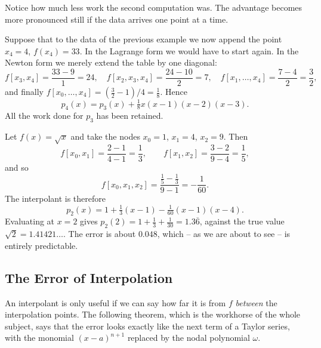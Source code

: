 Notice how much less work the second computation was. The advantage becomes more pronounced still if the data arrives one point at a time.

\begin{example}
  Suppose that to the data of the previous example we now append the point $x_4 = 4$, $f(x_4) = 33$. In the Lagrange form we would have to start again. In the Newton form we merely extend the table by one diagonal:
  $$
  f[x_3, x_4] = \frac{33 - 9}{1} = 24, \quad f[x_2, x_3, x_4] = \frac{24 - 10}{2} = 7, \quad f[x_1, \dots, x_4] = \frac{7 - 4}{2} = \frac{3}{2},
  $$
  and finally $f[x_0, \dots, x_4] = (\tfrac{3}{2} - 1)/4 = \tfrac{1}{8}$. Hence
  $$
  p_4(x) = p_3(x) + \tfrac{1}{8}x(x-1)(x-2)(x-3).
  $$
  All the work done for $p_3$ has been retained.
\end{example}

\begin{example}
  Let $f(x) = \sqrt{x}$ and take the nodes $x_0 = 1$, $x_1 = 4$, $x_2 = 9$. Then
  $$
  f[x_0, x_1] = \frac{2 - 1}{4 - 1} = \frac{1}{3}, \qquad f[x_1, x_2] = \frac{3 - 2}{9 - 4} = \frac{1}{5},
  $$
  and so
  $$
  f[x_0, x_1, x_2] = \frac{\frac{1}{5} - \frac{1}{3}}{9 - 1} = -\frac{1}{60}.
  $$
  The interpolant is therefore
  $$
  p_2(x) = 1 + \tfrac{1}{3}(x-1) - \tfrac{1}{60}(x-1)(x-4).
  $$
  Evaluating at $x = 2$ gives $p_2(2) = 1 + \tfrac{1}{3} + \tfrac{1}{30} = 1.3\overline{6}$, against the true value $\sqrt{2} = 1.41421\ldots$. The error is about $0.048$, which -- as we are about to see -- is entirely predictable.
\end{example}

\subsection{The Error of Interpolation}

An interpolant is only useful if we can say how far it is from $f$ \emph{between} the interpolation points. The following theorem, which is the workhorse of the whole subject, says that the error looks exactly like the next term of a Taylor series, with the monomial $(x - a)^{n+1}$ replaced by the nodal polynomial $\omega$.

